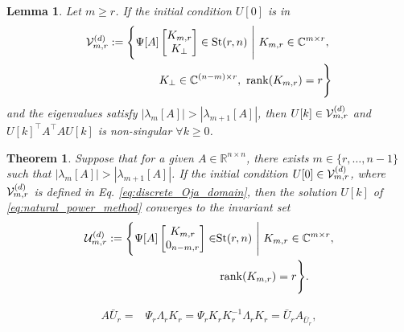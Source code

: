 \documentclass[10pt,a4paper]{amsart}
\newtheorem{lem}{Lemma}
\newtheorem{thm}{Theorem}
\begin{document}
\begin{lem}\label{lemma:discrete_norank_deficit}
Let $m\geq r$. If the initial condition $U[0]$ is in 
\begin{align}
    \mathcal{V}_{m,r}^{\rm (d)} := \Bigg{\{} \Psi [A] & \begin{bmatrix} K_{m,r} \\ K_{\perp} \end{bmatrix}  \in \mathrm{St}(r,n) \ \Bigg{|} \ 
    K_{m,r} \in \mathbb{C}^{m\times r},
     \nonumber \\ &
    K_{\perp} \in \mathbb{C}^{(n-m) \times r}, 
    \ \mathrm{rank}(K_{m,r}) =r \Bigg{\}}
    \label{eq:discrete_Oja_domain}
\end{align}
and the eigenvalues satisfy $| \lambda _{m}[A]| > | \lambda _{m+1}[A]|$, then $U[k] \in \mathcal{V}_{m,r}^{\rm (d)}$ and $U[k]^{\top}A^{\top}AU[k]$ is non-singular $\forall k\geq 0$.
\end{lem}

\begin{thm}\label{thm:discrete_eigenvector_subspace}
Suppose that for a given $A\in \mathbb{R}^{n\times n}$, there exists $m \in \{r, \dots ,n-1\}$ such that $| \lambda _{m} [A] | > | \lambda _{m+1} [A] | $. 
If the initial condition $U[0] \in \mathcal{V}_{m,r}^{\rm (d)}$, where $\mathcal{V}_{m,r}^{\rm (d)}$ is defined in Eq. \eqref{eq:discrete_Oja_domain}, then the solution $U[k]$ of \eqref{eq:natural_power_method} converges to the invariant set
\begin{align}
    \mathcal{U}_{m,r}^{\rm (d)} := \Bigg{\{} \Psi [A] \begin{bmatrix} K_{m,r} \\ 0_{n-m,r} \end{bmatrix}  \in & \mathrm{St}(r,n)  \ \Bigg{|}  \ K_{m,r} \in \mathbb{C}^{m\times r},
    \nonumber \\ &
    \ \mathrm{rank}(K_{m,r}) =r \Bigg{\}}.
    \label{eq:discrete_equillibriums}
\end{align}
\end{thm}

\begin{align}
    A \bar{U}_{r} = & \Psi _{r} \Lambda _{r} K_{r}
    = 
    \Psi _{r} K_{r} K_{r}^{-1} \Lambda _{r} K_{r} =  \bar{U} _{r}A_{\bar{U}_{r}}, 
    \label{eq:exponential_property}
\end{align}
\end{document}
